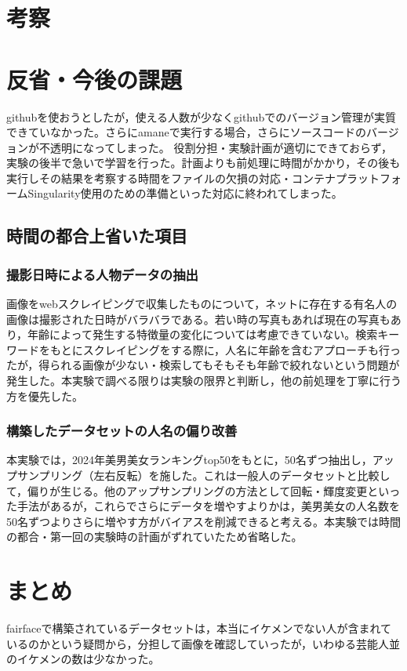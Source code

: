 \documentclass[a4paper,11pt,titlepage]{jsarticle}
\begin{document}
\section{考察}

\section{反省・今後の課題}
githubを使おうとしたが，使える人数が少なくgithubでのバージョン管理が実質できていなかった。さらにamaneで実行する場合，さらにソースコードのバージョンが不透明になってしまった。
役割分担・実験計画が適切にできておらず，実験の後半で急いで学習を行った。計画よりも前処理に時間がかかり，その後も実行しその結果を考察する時間をファイルの欠損の対応・コンテナプラットフォームSingularity使用のための準備といった対応に終われてしまった。

\subsection{時間の都合上省いた項目}
\subsubsection{撮影日時による人物データの抽出}
画像をwebスクレイピングで収集したものについて，ネットに存在する有名人の画像は撮影された日時がバラバラである。若い時の写真もあれば現在の写真もあり，年齢によって発生する特徴量の変化については考慮できていない。検索キーワードをもとにスクレイピングをする際に，人名に年齢を含むアプローチも行ったが，得られる画像が少ない・検索してもそもそも年齢で絞れないという問題が発生した。本実験で調べる限りは実験の限界と判断し，他の前処理を丁寧に行う方を優先した。

\subsubsection{構築したデータセットの人名の偏り改善}
本実験では，2024年美男美女ランキングtop50をもとに，50名ずつ抽出し，アップサンプリング（左右反転）を施した。これは一般人のデータセットと比較して，偏りが生じる。他のアップサンプリングの方法として回転・輝度変更といった手法があるが，これらでさらにデータを増やすよりかは，美男美女の人名数を50名ずつよりさらに増やす方がバイアスを削減できると考える。本実験では時間の都合・第一回の実験時の計画がずれていたため省略した。

\section{まとめ}
fairfaceで構築されているデータセットは，本当にイケメンでない人が含まれているのかという疑問から，分担して画像を確認していったが，いわゆる芸能人並のイケメンの数は少なかった。
\end{document}
